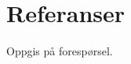 \documentclass[]{friggeri-cv} %
\begin{document}

\section{Referanser}
Oppgis på forespørsel.
%
%
%
%
%
%
%
%
%
%

\end{document}
